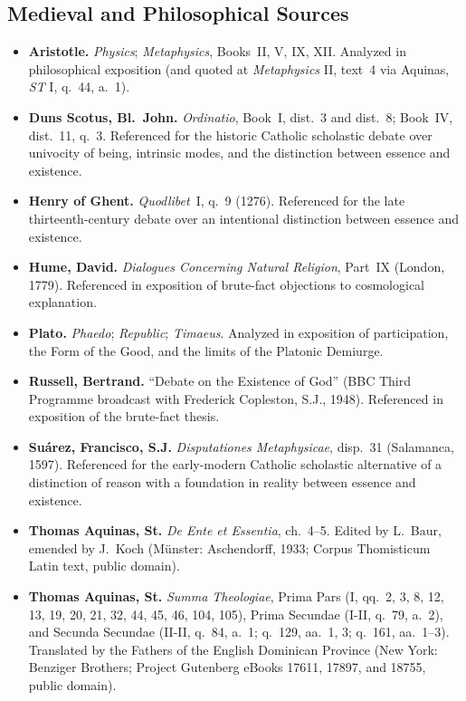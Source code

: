 \subsection*{Medieval and Philosophical Sources}

\begin{itemize}
\item \textbf{Aristotle.} \emph{Physics}; \emph{Metaphysics}, Books~II, V, IX, XII. Analyzed in philosophical exposition (and quoted at \emph{Metaphysics} II, text~4 via Aquinas, \emph{ST} I, q.~44, a.~1).
\item \textbf{Duns Scotus, Bl.\ John.} \emph{Ordinatio}, Book~I, dist.~3 and dist.~8; Book~IV, dist.~11, q.~3. Referenced for the historic Catholic scholastic debate over univocity of being, intrinsic modes, and the distinction between essence and existence.
\item \textbf{Henry of Ghent.} \emph{Quodlibet}~I, q.~9 (1276). Referenced for the late thirteenth-century debate over an intentional distinction between essence and existence.
\item \textbf{Hume, David.} \emph{Dialogues Concerning Natural Religion}, Part~IX (London, 1779). Referenced in exposition of brute-fact objections to cosmological explanation.
\item \textbf{Plato.} \emph{Phaedo}; \emph{Republic}; \emph{Timaeus}. Analyzed in exposition of participation, the Form of the Good, and the limits of the Platonic Demiurge.
\item \textbf{Russell, Bertrand.} ``Debate on the Existence of God'' (BBC Third Programme broadcast with Frederick Copleston, S.J., 1948). Referenced in exposition of the brute-fact thesis.
\item \textbf{Su\'{a}rez, Francisco, S.J.} \emph{Disputationes Metaphysicae}, disp.~31 (Salamanca, 1597). Referenced for the early-modern Catholic scholastic alternative of a distinction of reason with a foundation in reality between essence and existence.
\item \textbf{Thomas Aquinas, St.} \emph{De Ente et Essentia}, ch.~4--5. Edited by L.\ Baur, emended by J.\ Koch (M\"unster: Aschendorff, 1933; Corpus Thomisticum Latin text, public domain).
\item \textbf{Thomas Aquinas, St.} \emph{Summa Theologiae}, Prima Pars (I, qq.~2, 3, 8, 12, 13, 19, 20, 21, 32, 44, 45, 46, 104, 105), Prima Secundae (I-II, q.~79, a.~2), and Secunda Secundae (II-II, q.~84, a.~1; q.~129, aa.~1, 3; q.~161, aa.~1--3). Translated by the Fathers of the English Dominican Province (New York: Benziger Brothers; Project Gutenberg eBooks 17611, 17897, and 18755, public domain).
\end{itemize}
